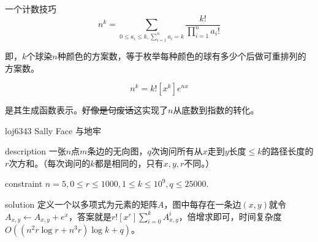 \documentclass{beamer}
\begin{document}
	\begin{frame}{一个计数技巧}
		$$n^k=\sum_{0 \le a_i \le k, \sum\limits_{i=1}^na_i = k}\frac{k!}{\prod\limits_{i=1}^na_i!}$$
		
		即，$k$个球染$n$种颜色的方案数，等于枚举每种颜色的球有多少个后做可重排列的方案数。
		
		$$n^k=k![x^k]e^{nx}$$
		
		是其生成函数表示。\sout{好像是句废话}这实现了$n$从底数到指数的转化。
	\end{frame}
	\begin{frame}{loj6343 Sally Face 与地牢}
		\begin{block}{description}
			一张$n$点$m$条边的无向图，$q$次询问所有从$x$走到$y$长度$\le k$的路径长度的$r$次方和。（每次询问的$k$都是相同的，只有$x, y, r$不同。）
		\end{block}
		\begin{block}{constraint}
			$n = 5, 0 \le r \le 1000, 1\le k \le 10^9, q \le 25000.$
		\end{block}
		\pause
		\begin{block}{solution}
			定义一个以多项式为元素的矩阵$A$，图中每存在一条边$(x,y)$就令$A_{x,y} \gets A_{x,y} +e^x$，答案就是$r![x^r]\sum\limits_{i=0}^kA^i_{x,y}$，倍增求即可，时间复杂度$O((n^2r\log r+n^3r)\log k + q)$。
		\end{block}
	\end{frame}
\end{document}
